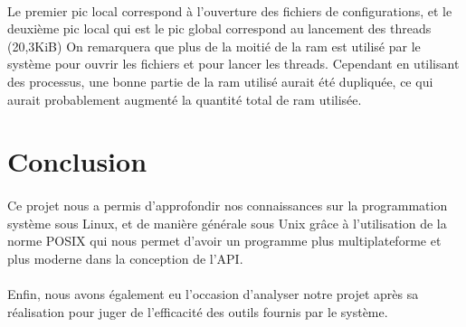 \documentclass[article, backcover, french, nodocumentinfo]{upmethodology-document}
\begin{document}
					\paragraph*{}
						Le premier pic local correspond à l'ouverture des fichiers de configurations,
						et le deuxième pic local qui est le pic global correspond au lancement des threads (20,3KiB)
						On remarquera que plus de la moitié de la ram est utilisé par le système pour ouvrir les fichiers et pour lancer les threads.
						Cependant en utilisant des processus, une bonne partie de la ram utilisé aurait été dupliquée, ce qui aurait probablement augmenté la quantité total de
						ram utilisée.
	\section*{Conclusion}
		\paragraph*{}
			Ce projet nous a permis d'approfondir nos connaissances sur la programmation système sous Linux, et de manière générale
			sous Unix grâce à l'utilisation de la norme POSIX qui nous permet d'avoir un programme plus multiplateforme et plus moderne
			dans la conception de l'API.
		\paragraph*{}
			Enfin, nous avons également eu l'occasion d'analyser notre projet après sa réalisation pour juger de l'efficacité des outils fournis par le système.
\end{document}
